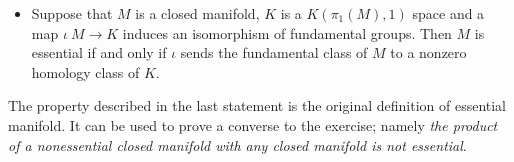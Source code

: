 \begin{itemize}
 \item Suppose that $M$ is a closed manifold, 
$K$ is a $K(\pi_1(M),1)$ space and a map $\iota\:M\to K$ induces an isomorphism of fundamental groups.
Then $M$ is essential if and only if $\iota$ sends the fundamental class of $M$ to a nonzero homology class of $K$.
\end{itemize}

The property described in the last statement is the original definition of essential manifold.
It can be used to prove a converse to the exercise;
namely \emph{the product of a nonessential closed manifold with any closed manifold is \emph{not} essential}.



